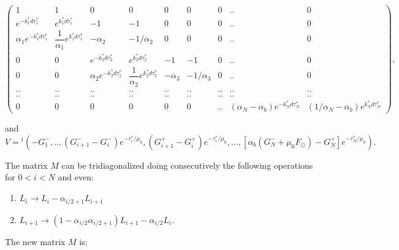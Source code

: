 \documentclass[a4paper,11pt]{article}
\begin{document}
\begin{small}
\begin{equation*}
\begin{pmatrix} 
1 & 1 & 0 & 0 & 0 & 0 & 0 & .. & 0\\ 
e^{-k_1^* d\tau_1^*} & e^{k_1^* d\tau_1^*} & -1 & -1 & 0 &  0 & 0 & .. & 0\\ 
\alpha_1 e^{-k_1^* d\tau_1^*} & \dfrac{1}{\alpha_1}e^{k_1^* d\tau_1^*} & -\alpha_2  & -1/\alpha_2 & 0 & 0 & 0 & .. & 0 \\ 
0 & 0 & e^{-k_2^* d\tau_2^*} & e^{k_2^* d\tau_2^*} & -1 & -1 &  0 & .. & 0 \\  
0 & 0 & \alpha_2 e^{-k_2^* d\tau_2^*} & \dfrac{1}{\alpha_2}e^{k_2^* d\tau_2^*} & -\alpha_3 & -1/\alpha_3 & 0 & .. & 0  \\  
.. & .. & .. & .. &  .. & .. & .. & .. & .. \\
.. & .. & .. & .. &  .. & .. & .. & .. & .. \\
0 & 0 & 0 & 0 &  0 & 0 & .. & (\alpha_N-\alpha_b) e^{-k_N^* d\tau_N^*} & (1/\alpha_N-\alpha_b) e^{k_N^* d\tau_N^*}  
\end{pmatrix},
\end{equation*}
\end{small}
and 
\begin{equation}
V={}^t(-G_1^{-},..,(G_{i+1}^{-}-G_{i}^{-})e^{-\tau_{i}^*/\mu_0},(G_{i+1}^{+}-G_{i}^{+})e^{-\tau_{i}^*/\mu_0},...,\left[\alpha_b(G_N^{-}+\mu_0 F_\odot)-G_{N}^{+}\right]e^{-\tau_{N}^*/\mu_0}).
\end{equation}

The matrix $M$ can be tridiagonalized doing consecutively the following operations for \mbox{$0<i<N$} and even:
\begin{enumerate}
\item $L_i \rightarrow L_i-\alpha_{i/2+1} L_{i+1}$
\item $L_{i+1} \rightarrow (1-\alpha_{i/2}\alpha_{i/2+1})L_{i+1}-\alpha_{i/2}L_i$.
\end{enumerate}

The new matrix $M$ is:
\end{document}
